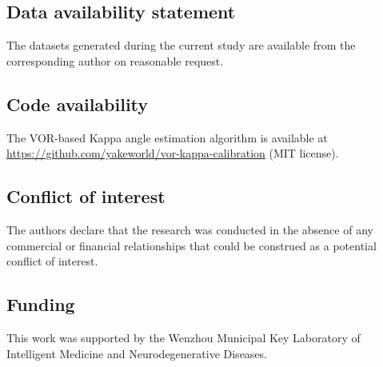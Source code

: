 \documentclass[review,numbers,sort&compress]{elsarticle}
\begin{document}
\subsection*{Data availability statement}
The datasets generated during the current study are available from the corresponding author on reasonable request.

\subsection*{Code availability}
The VOR-based Kappa angle estimation algorithm is available at \url{https://github.com/yakeworld/vor-kappa-calibration} (MIT license).

\subsection*{Conflict of interest}
The authors declare that the research was conducted in the absence of any commercial or financial relationships that could be construed as a potential conflict of interest.

\subsection*{Funding}
This work was supported by the Wenzhou Municipal Key Laboratory of Intelligent Medicine and Neurodegenerative Diseases.



\end{document}
